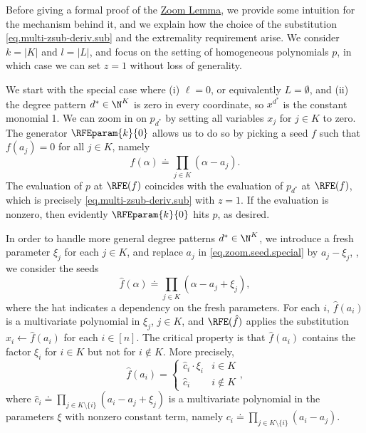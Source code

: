 \documentclass{toc}
\begin{document}
Before giving a formal proof of the \hyperref[lem.multi-zsub-deriv]{Zoom Lemma},
we provide some intuition for the mechanism behind it,
and we explain how the choice of the substitution
\eqref{eq.multi-zsub-deriv.sub} and the extremality requirement arise. We consider $k=|K|$ and $l=|L|$, and focus on the setting of homogeneous polynomials $p$, in which case we can set $z=1$ without loss of generality. 

We start with the special case where (i) $\ell=0$,
or equivalently $L=\emptyset$,
and (ii) the degree pattern $d^* \in \N^K$ is zero in every coordinate,
so \(x^{d^*}\) is the constant monomial 1.
We can zoom in on $p_{d^*}$ by setting all variables $x_j$ for $j \in K$ to
zero.
The generator $\RFEparam{k}{0}$ allows us to do so by picking a seed $f$ such
that $f(a_j)=0$ for all $j \in K$, namely
\begin{equation}\label{eq.zoom.seed.special}
  f(\alpha) \doteq \prod_{j\in K}(\alpha - a_j).
\end{equation}
The evaluation of $p$ at $\RFE(f)$ coincides with the evaluation of $p_{d^*}$
at $\RFE(f)$,
which is precisely \eqref{eq.multi-zsub-deriv.sub} with $z=1$.
If the evaluation is nonzero,
then evidently $\RFEparam{k}{0}$ hits $p$, as desired.

In order to handle more general degree patterns $d^* \in \N^K$, 
we introduce a fresh parameter $\xi_j$ for each $j \in K$,
and replace $a_j$ in \eqref{eq.zoom.seed.special} by $a_j - \xi_j$,
\ie, we consider the seeds
\begin{equation}\label{eq.zoom.seed.K}
  \hat{f}(\alpha) \doteq \prod_{j \in K} (\alpha - a_j + \xi_j),
\end{equation}
where the hat indicates a dependency on the fresh parameters.
For each \(i\),
\(\hat{f}(a_i)\) is a multivariate polynomial in $\xi_j$, $j \in K$,
and \(\RFE(\hat{f})\) applies the substitution \(x_i \gets \hat{f}(a_i)\)
for each \(i \in [n]\).
The critical property is that $\hat{f}(a_i)$ contains the factor \(\xi_i\) for $i \in K$ but not for $i \not\in K$.
More precisely,
\begin{equation*}
  \hat{f}(a_i) = \begin{cases}
    \hat{c}_i\cdot \xi_i & i \in K \\
    \hat{c}_i & i \not\in K
  \end{cases},
\end{equation*}
where
$\hat{c}_i \doteq \prod_{j \in K\setminus\{i\}} (a_i - a_j + \xi_j)$
is a multivariate polynomial in the parameters $\xi$ with nonzero constant
term,
namely $c_i \doteq \prod_{j \in K\setminus\{i\}} (a_i - a_j)$.
\end{document}
